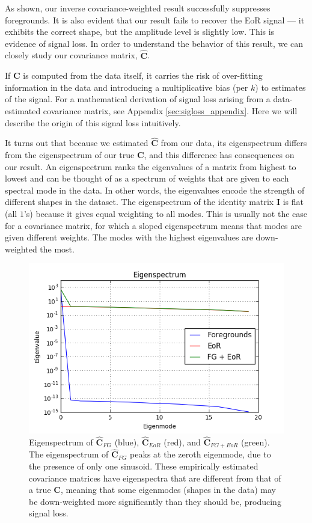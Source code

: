 \documentclass[preprint2,numberedappendix,tighten]{aastex6}  %
\begin{document}
As shown, our inverse covariance-weighted result successfully suppresses foregrounds. It is also evident that our result fails to recover the EoR signal --- it exhibits the correct shape, but the amplitude level is slightly low. This is evidence of signal loss. In order to understand the behavior of this result, we can closely study our covariance matrix, $\hat{\textbf{C}}$. %

If $\textbf{C}$ is computed from the data itself, it carries the risk of over-fitting information in the data and introducing a multiplicative bias (per $k$) to estimates of the signal. For a mathematical derivation of signal loss arising from a data-estimated covariance matrix, see Appendix \ref{sec:sigloss_appendix}. Here we will describe the origin of this signal loss intuitively.

It turns out that because we estimated $\hat{\textbf{C}}$ from our data, its eigenspectrum differs from the eigenspectrum of our true $\textbf{C}$, and this difference has consequences on our result. An eigenspectrum ranks the eigenvalues of a matrix from highest to lowest and can be thought of as a spectrum of weights that are given to each spectral mode in the data. In other words, the eigenvalues encode the strength of different shapes in the dataset. The eigenspectrum of the identity matrix $\textbf{I}$ is flat (all $1$'s) because it gives equal weighting to all modes. This is usually not the case for a covariance matrix, for which a sloped eigenspectrum means that modes are given different weights. The modes with the highest eigenvalues are down-weighted the most. 

\begin{figure}
	\centering
	\includegraphics[trim={0.3cm 0.2cm 0.3cm 0.3cm},clip,width=\columnwidth]{plots/toy_sigloss2.png}
	\caption{Eigenspectrum of $\hat{\textbf{C}}_{FG}$ (blue), $\hat{\textbf{C}}_{EoR}$ (red), and $\hat{\textbf{C}}_{FG+EoR}$ (green). The eigenspectrum of $\hat{\textbf{C}}_{FG}$ peaks at the zeroth eigenmode, due to the presence of only one sinusoid. These empirically estimated covariance matrices have eigenspectra that are different from that of a true $\textbf{C}$, meaning that some eigenmodes (shapes in the data) may be down-weighted more significantly than they should be, producing signal loss.}
	\label{fig:toy_sigloss2}
\end{figure}
\end{document}
